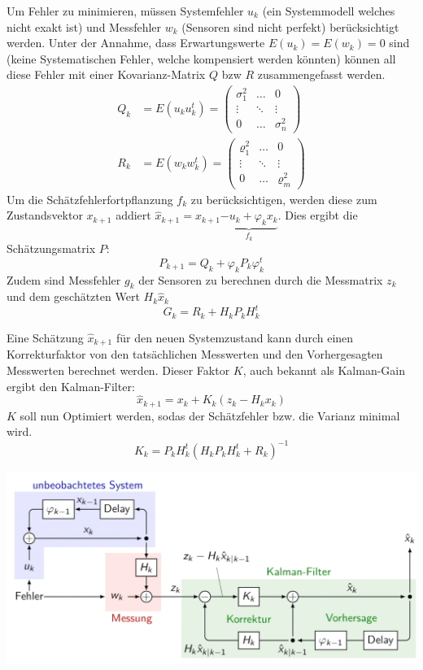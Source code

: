 Um Fehler zu minimieren, müssen Systemfehler $u_k$ (ein Systemmodell welches nicht exakt ist) und Messfehler $w_k$ (Sensoren sind nicht perfekt) berücksichtigt werden. Unter der Annahme, dass Erwartungswerte $E(u_k) = E(w_k) = 0$ sind (keine Systematischen Fehler, welche kompensiert werden könnten) können all diese Fehler mit einer Kovarianz-Matrix $Q$ bzw $R$ zusammengefasst werden. 
\begin{align*}
	Q_k &= E(u_ku^t_k) = \begin{pmatrix}
		\sigma_1^2 & \dots  & 0 \\
		\vdots & \ddots & \vdots \\
		0 & \dots & \sigma^2_n
	\end{pmatrix} \\
	R_k &= E(w_kw^t_k) = \begin{pmatrix}
	\varrho_1^2 & \dots  & 0 \\
	\vdots & \ddots & \vdots \\
	0 & \dots & \varrho^2_m
\end{pmatrix} 
\end{align*}
Um die Schätzfehlerfortpflanzung $f_k$ zu berücksichtigen, werden diese zum Zustandsvektor $x_{k+1}$ addiert $\hat{x}_{k+1} = x_{k+1} \underbrace{- u_k + \varphi_kx_k}_{f_k}$. Dies ergibt die Schätzungsmatrix $P$:
\[
	P_{k+1} = Q_k + \varphi_kP_k\varphi_k^t
\]
Zudem sind Messfehler $g_k$ der Sensoren zu berechnen durch die Messmatrix $z_k$ und dem geschätzten Wert $H_k\hat{x}_k$
\[
G_k = R_k + H_kP_kH^t_k
\]


Eine Schätzung $\hat{x}_{k+1}$ für den neuen Systemzustand kann durch einen Korrekturfaktor von den tatsächlichen Messwerten und den Vorhergesagten Messwerten berechnet werden. Dieser Faktor $K$, auch bekannt als Kalman-Gain ergibt den Kalman-Filter:
\[
\hat{x}_{k+1} = x_{k} + K_k(z_k - H_kx_k)
\] 
$K$ soll nun Optimiert werden, sodas der Schätzfehler bzw. die Varianz minimal wird. 
\[
K_k = P_kH_k^t(H_kP_kH^t_k + R_k)^{-1}
\]
\begin{center}
	\includegraphics[width=0.9\columnwidth]{Images/kalman}
\end{center}